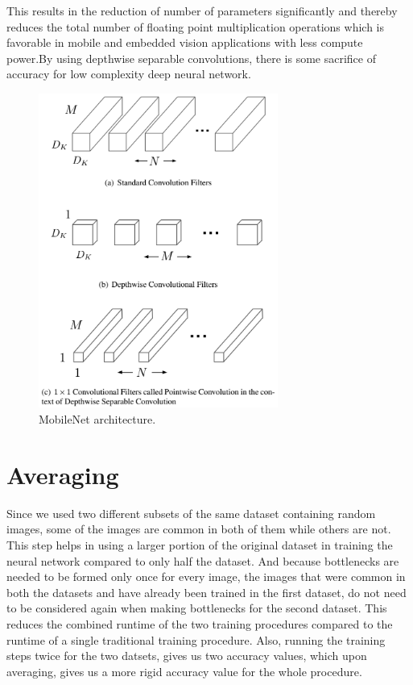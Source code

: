 \documentclass[12pt]{report}
\begin{document}
\noindent This results in the reduction of number of parameters significantly and thereby reduces the total number of floating point multiplication operations which is favorable in mobile and embedded vision applications with less compute power.By using depthwise separable convolutions, there is some sacrifice of accuracy for low complexity deep neural network.

\begin{figure}[h]
\centering
\includegraphics[width=0.7\textwidth]{Pic5}
\caption{MobileNet architecture.}
\label{fig:test7}
\end{figure}

\section{Averaging}

Since we used two different subsets of the same dataset containing random images, some of the images are common in both of them while others are not. This step helps in using a larger portion of the original dataset in training the neural network compared to only half the dataset. And because bottlenecks are needed to be formed only once for every image, the images that were common in both the datasets and have already been trained in the first dataset, do not need to be considered again when making bottlenecks for the second dataset. This reduces the combined runtime of the two training procedures compared to the runtime of a single traditional training procedure. Also, running the training steps twice for the two datsets, gives us two accuracy values, which upon averaging, gives us a more rigid accuracy value for the whole procedure. 
\end{document}
